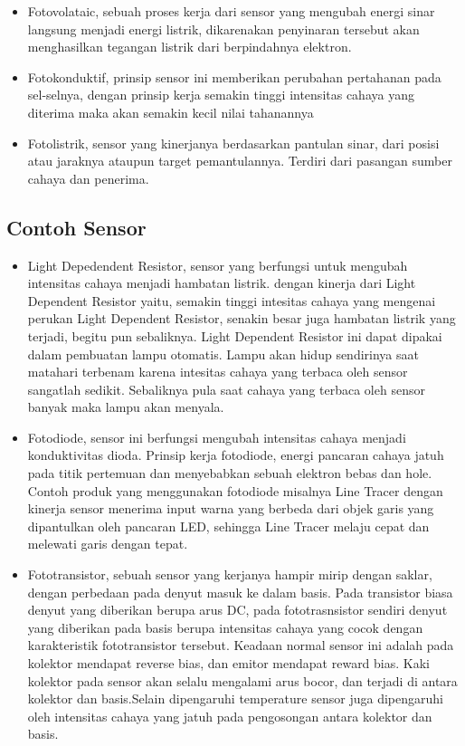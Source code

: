 	\begin{itemize}
	\item Fotovolataic, sebuah proses kerja dari sensor yang mengubah energi sinar langsung menjadi energi listrik, dikarenakan penyinaran tersebut akan menghasilkan tegangan listrik dari berpindahnya elektron.
	\item Fotokonduktif, prinsip sensor ini memberikan perubahan pertahanan pada sel-selnya, dengan prinsip kerja semakin tinggi intensitas cahaya yang diterima maka akan semakin kecil nilai tahanannya
	\item Fotolistrik, sensor yang kinerjanya berdasarkan pantulan sinar, dari posisi atau jaraknya ataupun target pemantulannya. Terdiri dari pasangan sumber cahaya dan penerima.
	\end {itemize}

\subsection{Contoh Sensor}
	\begin {itemize}
	\item Light Depedendent Resistor, sensor yang berfungsi untuk mengubah intensitas cahaya menjadi hambatan listrik. dengan kinerja dari Light Dependent Resistor yaitu, semakin tinggi intesitas cahaya yang mengenai perukan Light Dependent Resistor, senakin besar juga hambatan listrik yang terjadi, begitu pun sebaliknya. Light Dependent Resistor ini dapat dipakai dalam pembuatan lampu otomatis. Lampu akan hidup sendirinya saat matahari terbenam karena intesitas cahaya yang terbaca oleh sensor sangatlah sedikit. Sebaliknya pula saat cahaya yang terbaca oleh sensor banyak maka lampu akan menyala.
	\item Fotodiode, sensor ini berfungsi mengubah intensitas cahaya menjadi konduktivitas dioda. Prinsip kerja fotodiode, energi pancaran cahaya jatuh pada titik pertemuan dan menyebabkan sebuah elektron bebas dan hole. Contoh produk yang menggunakan fotodiode misalnya Line Tracer dengan kinerja sensor menerima input warna yang berbeda dari objek garis yang dipantulkan oleh pancaran LED, sehingga Line Tracer melaju cepat dan melewati garis dengan tepat.
	\item Fototransistor, sebuah sensor yang kerjanya hampir mirip dengan saklar, dengan perbedaan pada denyut masuk ke dalam basis. Pada transistor biasa denyut yang diberikan berupa arus DC, pada fototrasnsistor sendiri denyut yang diberikan pada basis berupa intensitas cahaya yang cocok dengan karakteristik fototransistor tersebut. Keadaan normal sensor ini adalah pada kolektor mendapat reverse bias, dan emitor mendapat reward bias. Kaki kolektor pada sensor akan selalu mengalami arus bocor, dan terjadi di antara kolektor dan basis.Selain dipengaruhi temperature sensor juga dipengaruhi oleh intensitas cahaya yang jatuh pada pengosongan antara kolektor dan basis.
	\end{itemize}

